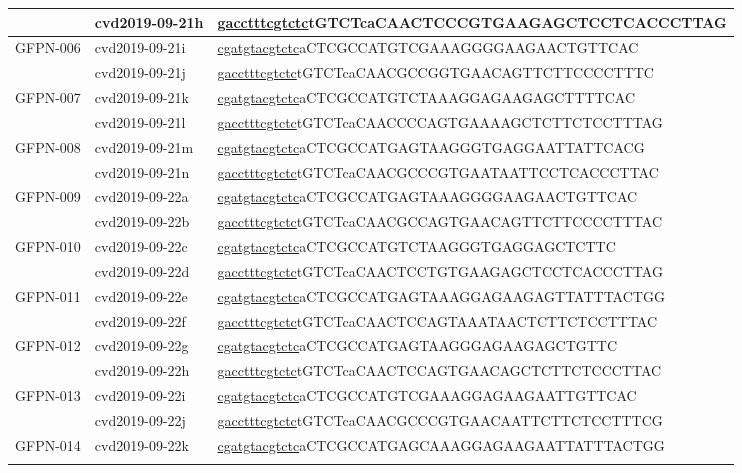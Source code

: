 \begin{landscape}
\begin{longtable}{|l|l|l|}
		& cvd2019-09-21h & \underline{gacctttcgtctc}tGTCTcaCAACTCCCGTGAAGAGCTCCTCACCCTTAG \\ \hline
		\multirow{2}{*}{GFPN-006} & cvd2019-09-21i & \underline{cgatgtacgtctc}aCTCGCCATGTCGAAAGGGGAAGAACTGTTCAC     \\ \cline{2-3} 
		& cvd2019-09-21j & \underline{gacctttcgtctc}tGTCTcaCAACGCCGGTGAACAGTTCTTCCCCTTTC  \\ \hline
		\multirow{2}{*}{GFPN-007} & cvd2019-09-21k & \underline{cgatgtacgtctc}aCTCGCCATGTCTAAAGGAGAAGAGCTTTTCAC     \\ \cline{2-3} 
		& cvd2019-09-21l & \underline{gacctttcgtctc}tGTCTcaCAACCCCAGTGAAAAGCTCTTCTCCTTTAG \\ \hline
		\multirow{2}{*}{GFPN-008} & cvd2019-09-21m & \underline{cgatgtacgtctc}aCTCGCCATGAGTAAGGGTGAGGAATTATTCACG    \\ \cline{2-3} 
		& cvd2019-09-21n & \underline{gacctttcgtctc}tGTCTcaCAACGCCCGTGAATAATTCCTCACCCTTAC \\ \hline
		\multirow{2}{*}{GFPN-009} & cvd2019-09-22a & \underline{cgatgtacgtctc}aCTCGCCATGAGTAAAGGGGAAGAACTGTTCAC     \\ \cline{2-3} 
		& cvd2019-09-22b & \underline{gacctttcgtctc}tGTCTcaCAACGCCAGTGAACAGTTCTTCCCCTTTAC \\ \hline
		\multirow{2}{*}{GFPN-010} & cvd2019-09-22c & \underline{cgatgtacgtctc}aCTCGCCATGTCTAAGGGTGAGGAGCTCTTC       \\ \cline{2-3} 
		& cvd2019-09-22d & \underline{gacctttcgtctc}tGTCTcaCAACTCCTGTGAAGAGCTCCTCACCCTTAG \\ \hline
		\multirow{2}{*}{GFPN-011} & cvd2019-09-22e & \underline{cgatgtacgtctc}aCTCGCCATGAGTAAAGGAGAAGAGTTATTTACTGG  \\ \cline{2-3} 
		& cvd2019-09-22f & \underline{gacctttcgtctc}tGTCTcaCAACTCCAGTAAATAACTCTTCTCCTTTAC \\ \hline
		\multirow{2}{*}{GFPN-012} & cvd2019-09-22g & \underline{cgatgtacgtctc}aCTCGCCATGAGTAAGGGAGAAGAGCTGTTC       \\ \cline{2-3} 
		& cvd2019-09-22h & \underline{gacctttcgtctc}tGTCTcaCAACTCCAGTGAACAGCTCTTCTCCCTTAC \\ \hline
		\multirow{2}{*}{GFPN-013} & cvd2019-09-22i & \underline{cgatgtacgtctc}aCTCGCCATGTCGAAAGGAGAAGAATTGTTCAC     \\ \cline{2-3} 
		& cvd2019-09-22j & \underline{gacctttcgtctc}tGTCTcaCAACGCCCGTGAACAATTCTTCTCCTTTCG \\ \hline
		\multirow{2}{*}{GFPN-014} & cvd2019-09-22k & \underline{cgatgtacgtctc}aCTCGCCATGAGCAAAGGAGAAGAATTATTTACTGG  \\ \cline{2-3} 

\end{longtable}
\end{landscape}
